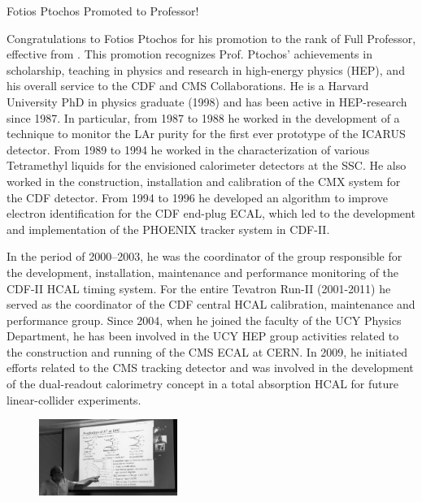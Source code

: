 \begin{headline}[enhanced, tikz={rotate=0}, width=0.48\textwidth]{Fotios Ptochos Promoted to Professor!}
\begin{multicols}{2}
    Congratulations to Fotios Ptochos for his promotion to the rank of
    Full Professor, effective from \MyDate. This promotion recognizes
    Prof. Ptochos' achievements in scholarship, teaching in physics
    and research in high-energy physics (HEP), and his overall service
    to the CDF and CMS Collaborations. He is a Harvard University PhD
    in physics graduate (1998) and has been active in HEP-research
    since 1987. In particular, from 1987 to 1988 he worked in the
    development of a technique to monitor the LAr purity for the first
    ever prototype of the ICARUS detector. From 1989 to 1994 he worked
    in the characterization of various Tetramethyl liquids for the
    envisioned calorimeter detectors at the SSC. He also
    worked in the construction, installation and calibration of the
    CMX system for the CDF detector. From 1994 to 1996 he developed an algorithm to improve
    electron identification for the CDF end-plug ECAL, which led to
    the development and implementation of the PHOENIX tracker system
    in CDF-II.

    In the period of 2000–2003, he was the coordinator of the group
    responsible for the development, installation, maintenance and
    performance monitoring of the CDF-II HCAL timing system. For the entire Tevatron Run-II
    (2001-2011) he served as the coordinator of the CDF central HCAL
    calibration, maintenance and performance group. Since
    2004, when he joined the faculty of the UCY Physics Department, he has
    been involved in the UCY HEP group activities related to the
    construction and running of the CMS ECAL at CERN. In 2009, he
    initiated efforts related to the CMS tracking detector and was
    involved in the development of the dual-readout calorimetry
    concept in a total absorption HCAL for future linear-collider experiments. 

    \begin{figure}
      \begin{center}
        \leavevmode
        \includegraphics[width=0.4\textwidth]{./figures/Fotis7.png}
      \end{center}
    \end{figure}


\end{multicols}
\end{headline}
